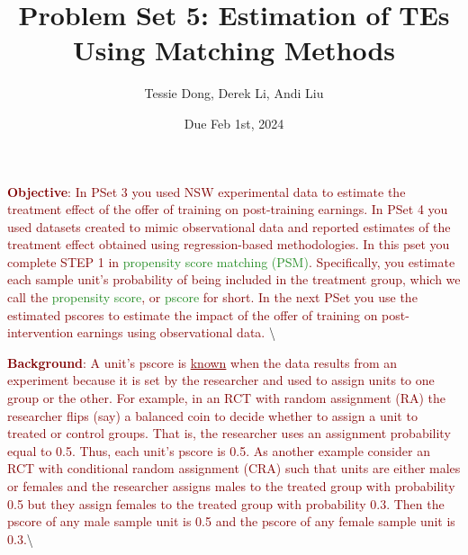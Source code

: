 \documentclass[
]{article}
\title{Problem Set 5: Estimation of TEs Using Matching Methods}
\author{Tessie Dong, Derek Li, Andi Liu}
\date{Due Feb 1st, 2024}
\begin{document}
\maketitle

\newlength{\dhatheight}
\newcommand{\doublehat}[1]{%
    \settoheight{\dhatheight}{\ensuremath{\hat{#1}}}%
    \addtolength{\dhatheight}{-0.35ex}%
    \hat{\vphantom{\rule{1pt}{\dhatheight}}%
    \smash{\hat{#1}}}}

\noindent \textcolor{Maroon}{\textbf{Objective}: In PSet 3 you used NSW experimental data to estimate the treatment effect of the offer of training on post-training earnings. In PSet 4 you used datasets created to mimic observational data and reported estimates of the treatment effect obtained using regression-based methodologies. In this pset you complete STEP 1 in \textcolor{ForestGreen}{propensity score matching (PSM)}. Specifically, you estimate each sample unit's probability of being included in the treatment group, which we call the \textcolor{ForestGreen}{propensity score}, or \textcolor{ForestGreen}{pscore} for short. In the next PSet you use the estimated pscores to estimate the impact of the offer of training on post-intervention earnings using observational data.}
\textbackslash{}

\noindent \textcolor{Maroon}{\textbf{Background}: A unit's pscore is \underline{known} when the data results from an experiment because it is set by the researcher and used to assign units to one group or the other. For example, in an RCT with random assignment (RA) the researcher flips (say) a balanced coin to decide whether to assign a unit to treated or control groups. That is, the researcher uses an assignment probability equal to 0.5. Thus, each unit's pscore is 0.5. As another example consider an RCT with conditional random assignment (CRA) such that units are either males or females and the researcher assigns males to the treated group with probability 0.5 but they assign females to the treated group with probability 0.3. Then the pscore of any male sample unit is 0.5 and the pscore of any female sample unit is 0.3.}\textbackslash{}
\end{document}
